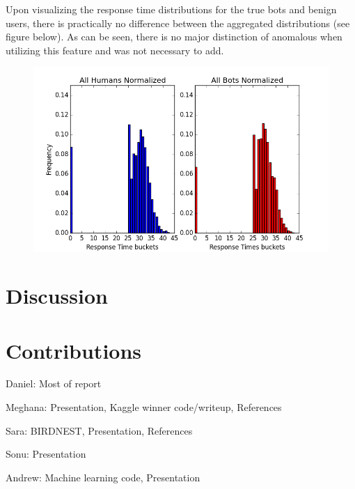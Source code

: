 \documentclass{article} %
\begin{document}
Upon visualizing the response time distributions for the true bots and benign users, there is practically no difference between the aggregated distributions (see figure below).
As can be seen, there is no major distinction of anomalous when utilizing this feature and was not necessary to add.

\begin{figure}[h]
\centering
{\includegraphics[scale=0.5]{img/bird_res_dist.png}}
\end{figure}

\section{Discussion}

\section{Contributions}

Daniel: Most of report

Meghana: Presentation, Kaggle winner code/writeup, References

Sara: BIRDNEST, Presentation, References

Sonu: Presentation

Andrew: Machine learning code, Presentation
\end{document}
